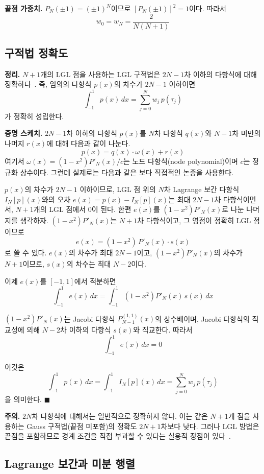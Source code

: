 \documentclass[11pt]{article}
\begin{document}
\textbf{끝점 가중치.} $P_N(\pm 1) = (\pm 1)^N$이므로 $[P_N(\pm 1)]^2 = 1$이다. 따라서
\[
w_0 = w_N = \frac{2}{N(N+1)}
\]

\subsection{구적법 정확도}
\label{sec:quadrature}

\textbf{정리.} $N+1$개의 LGL 점을 사용하는 LGL 구적법은 $2N-1$차 이하의 다항식에 대해 정확하다~\cite{Canuto2006}. 즉, 임의의 다항식 $p(x)$의 차수가 $2N-1$ 이하이면
\[
\int_{-1}^{1} p(x)\, dx = \sum_{j=0}^{N} w_j\, p(\tau_j)
\]
가 정확히 성립한다.

\textbf{증명 스케치.} $2N-1$차 이하의 다항식 $p(x)$를 $N$차 다항식 $q(x)$와 $N-1$차 미만의 나머지 $r(x)$에 대해 다음과 같이 나눈다.
\[
p(x) = q(x) \cdot \omega(x) + r(x)
\]
여기서 $\omega(x) = (1-x^2) P'_N(x) / c$는 노드 다항식(node polynomial)이며 $c$는 정규화 상수이다. 그런데 실제로는 다음과 같은 보다 직접적인 논증을 사용한다.

$p(x)$의 차수가 $2N-1$ 이하이므로, LGL 점 위의 $N$차 Lagrange 보간 다항식 $I_N[p](x)$와의 오차 $e(x) = p(x) - I_N[p](x)$는 최대 $2N-1$차 다항식이면서, $N+1$개의 LGL 점에서 0이 된다. 한편 $e(x)$를 $(1-x^2) P'_N(x)$로 나눈 나머지를 생각하자. $(1-x^2) P'_N(x)$는 $N+1$차 다항식이고, 그 영점이 정확히 LGL 점이므로
\[
e(x) = (1 - x^2)\, P'_N(x) \cdot s(x)
\]
로 쓸 수 있다. $e(x)$의 차수가 최대 $2N-1$이고, $(1-x^2) P'_N(x)$의 차수가 $N+1$이므로, $s(x)$의 차수는 최대 $N-2$이다.

이제 $e(x)$를 $[-1, 1]$에서 적분하면
\[
\int_{-1}^{1} e(x)\, dx = \int_{-1}^{1} (1-x^2) P'_N(x)\, s(x)\, dx
\]

$(1-x^2) P'_N(x)$는 Jacobi 다항식 $P_{N-1}^{(1,1)}(x)$의 상수배이며, Jacobi 다항식의 직교성에 의해 $N-2$차 이하의 다항식 $s(x)$와 직교한다. 따라서
\[
\int_{-1}^{1} e(x)\, dx = 0
\]

이것은
\[
\int_{-1}^{1} p(x)\, dx = \int_{-1}^{1} I_N[p](x)\, dx = \sum_{j=0}^{N} w_j\, p(\tau_j)
\]
을 의미한다. $\blacksquare$

\textbf{주의.} $2N$차 다항식에 대해서는 일반적으로 정확하지 않다. 이는 같은 $N+1$개 점을 사용하는 Gauss 구적법(끝점 미포함)의 정확도 $2N+1$차보다 낮다. 그러나 LGL 방법은 끝점을 포함하므로 경계 조건을 직접 부과할 수 있다는 실용적 장점이 있다~\cite{Herman1996}.

\subsection{Lagrange 보간과 미분 행렬}
\label{sec:diffmat}
\end{document}
